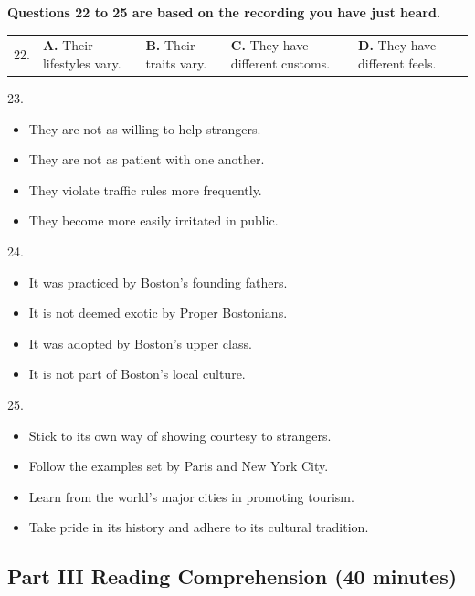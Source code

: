 \documentclass[UTF8,11pt]{ctexart}
\begin{document}
\textbf{Questions 22 to 25 are based on the recording you have just heard.}


\noindent\begin{tabularx}{\linewidth}{@{}lXXXX@{}}22. & \textbf{A.} Their lifestyles vary. & \textbf{B.} Their traits vary. & \textbf{C.} They have different customs. & \textbf{D.} They have different feels.\\\end{tabularx}\par

23.


\begin{itemize}[leftmargin=2em,itemsep=.2em,topsep=.4em]\item[A.] They are not as willing to help strangers.
\item[B.] They are not as patient with one another.
\item[C.] They violate traffic rules more frequently.
\item[D.] They become more easily irritated in public.
\end{itemize}

24.


\begin{itemize}[leftmargin=2em,itemsep=.2em,topsep=.4em]\item[A.] It was practiced by Boston’s founding fathers.
\item[B.] It is not deemed exotic by Proper Bostonians.
\item[C.] It was adopted by Boston’s upper class.
\item[D.] It is not part of Boston’s local culture.
\end{itemize}

25.


\begin{itemize}[leftmargin=2em,itemsep=.2em,topsep=.4em]\item[A.] Stick to its own way of showing courtesy to strangers.
\item[B.] Follow the examples set by Paris and New York City.
\item[C.] Learn from the world’s major cities in promoting tourism.
\item[D.] Take pride in its history and adhere to its cultural tradition.
\end{itemize}

\subsection*{\textbf{Part III Reading Comprehension (40 minutes)}}
\end{document}
